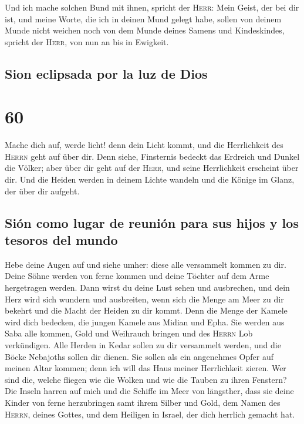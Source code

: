  Und ich mache solchen Bund mit ihnen, spricht der
\textsc{Herr}: Mein Geist, der bei dir ist, und meine Worte, die ich in
deinen Mund gelegt habe, sollen von deinem Munde nicht weichen noch von
dem Munde deines Samens und Kindeskindes, spricht der \textsc{Herr}, von
nun an bis in Ewigkeit.

\hypertarget{sion-eclipsada-por-la-luz-de-dios}{%
\subsection{Sion eclipsada por la luz de
Dios}\label{sion-eclipsada-por-la-luz-de-dios}}

\hypertarget{section-59}{%
\section{60}\label{section-59}}

 Mache dich auf, werde licht! denn dein Licht kommt, und
die Herrlichkeit des \textsc{Herrn} geht auf über dir. 
Denn siehe, Finsternis bedeckt das Erdreich und Dunkel die Völker; aber
über dir geht auf der \textsc{Herr}, und seine Herrlichkeit erscheint
über dir.  Und die Heiden werden in deinem Lichte wandeln
und die Könige im Glanz, der über dir aufgeht.

\hypertarget{siuxf3n-como-lugar-de-reuniuxf3n-para-sus-hijos-y-los-tesoros-del-mundo}{%
\subsection{Sión como lugar de reunión para sus hijos y los tesoros del
mundo}\label{siuxf3n-como-lugar-de-reuniuxf3n-para-sus-hijos-y-los-tesoros-del-mundo}}

 Hebe deine Augen auf und siehe umher: diese alle
versammelt kommen zu dir. Deine Söhne werden von ferne kommen und deine
Töchter auf dem Arme hergetragen werden.  Dann wirst du
deine Lust sehen und ausbrechen, und dein Herz wird sich wundern und
ausbreiten, wenn sich die Menge am Meer zu dir bekehrt und die Macht der
Heiden zu dir kommt.  Denn die Menge der Kamele wird dich
bedecken, die jungen Kamele aus Midian und Epha. Sie werden aus Saba
alle kommen, Gold und Weihrauch bringen und des \textsc{Herrn} Lob
verkündigen.  Alle Herden in Kedar sollen zu dir
versammelt werden, und die Böcke Nebajoths sollen dir dienen. Sie sollen
als ein angenehmes Opfer auf meinen Altar kommen; denn ich will das Haus
meiner Herrlichkeit zieren.  Wer sind die, welche fliegen
wie die Wolken und wie die Tauben zu ihren Fenstern?  Die
Inseln harren auf mich und die Schiffe im Meer von längsther, dass sie
deine Kinder von ferne herzubringen samt ihrem Silber und Gold, dem
Namen des \textsc{Herrn}, deines Gottes, und dem Heiligen in Israel, der
dich herrlich gemacht hat.

